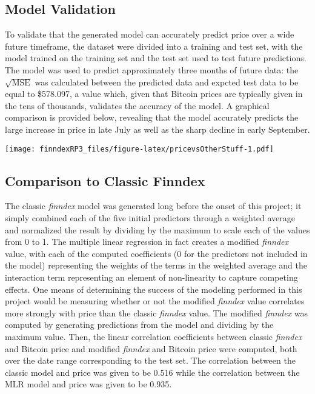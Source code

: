 \documentclass{article}
\begin{document}
\subsection{Model Validation}
To validate that the generated model can accurately predict price over a wide future timeframe, the dataset were divided into a training and test set, with the model trained on the training set and the test set used to test future predictions. The model was used to predict approximately three months of future data: the $\sqrt{\text{MSE}}$ was calculated between the predicted data and expcted test data to be equal to \$578.097, a value which, given that Bitcoin prices are typically given in the tens of thousands, validates the accuracy of the model. A graphical comparison is provided below, revealing that the model accurately predicts the large increase in price in late July as well as the sharp decline in early September. 
\begin{center}
\texttt{[image: finndexRP3\_files/figure-latex/pricevsOtherStuff-1.pdf]} 
\end{center}
\subsection{Comparison to Classic Finndex}
The classic \textit{finndex} model was generated long before the onset of this project; it simply combined each of the five initial predictors through a weighted average and normalized the result by dividing by the maximum to scale each of the values from 0 to 1. The multiple linear regression in fact creates a modified \textit{finndex} value, with each of the computed coefficients (0 for the predictors not included in the model) representing the weights of the terms in the weighted average and the interaction term representing an element of non-linearity to capture competing effects. One means of determining the success of the modeling performed in this project would be measuring whether or not the modified \textit{finndex} value correlates more strongly with price than the classic \textit{finndex} value. The modified \textit{finndex} was computed by generating predictions from the model and dividing by the maximum value. Then, the linear correlation coefficients between classic \textit{finndex} and Bitcoin price and modified \textit{finndex} and Bitcoin price were computed, both over the date range corresponding to the test set. The correlation between the classic model and price was given to be 0.516 while the correlation between the MLR model and price was given to be 0.935.
\end{document}

